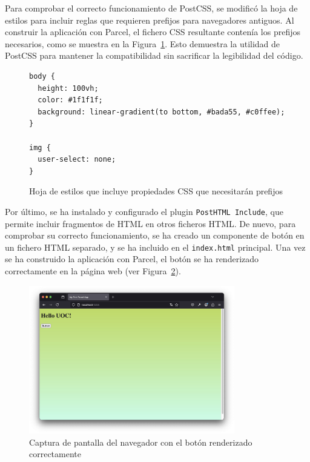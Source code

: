 \documentclass{article}
\begin{document}
Para comprobar el correcto funcionamiento de PostCSS, se modificó la hoja de estilos para incluir reglas que requieren prefijos para navegadores antiguos. Al construir la aplicación con Parcel, el fichero CSS resultante contenía los prefijos necesarios, como se muestra en la Figura~\ref{fig:styles-css}. Esto demuestra la utilidad de PostCSS para mantener la compatibilidad sin sacrificar la legibilidad del código.

\begin{figure}[h!]
\begin{verbatim}
body {
  height: 100vh;
  color: #1f1f1f;
  background: linear-gradient(to bottom, #bada55, #c0ffee);
}

img {
  user-select: none;
}
\end{verbatim}
\caption{Hoja de estilos que incluye propiedades CSS que necesitarán prefijos}
\label{fig:styles-css}
\end{figure}

Por último, se ha instalado y configurado el plugin \texttt{PostHTML Include}, que permite incluir fragmentos de HTML en otros ficheros HTML. De nuevo, para comprobar su correcto funcionamiento, se ha creado un componente de botón en un fichero HTML separado, y se ha incluido en el \texttt{index.html} principal. Una vez se ha construido la aplicación con Parcel, el botón se ha renderizado correctamente en la página web (ver Figura~\ref{fig:posthtml-include}).

\begin{figure}[h!]
    \centering
    \includegraphics[width=0.8\textwidth]{./img/p1/after-posthtml-include}
    \caption{Captura de pantalla del navegador con el botón renderizado correctamente}
    \label{fig:posthtml-include}
\end{figure}
\end{document}
